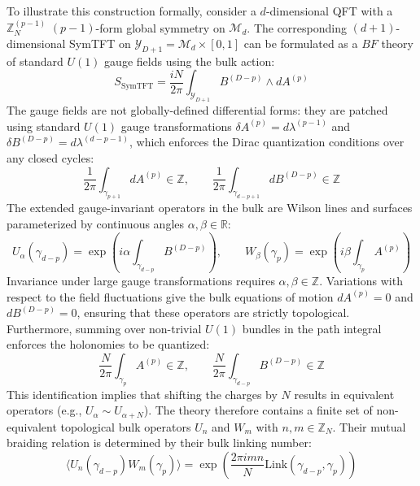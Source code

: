 \documentclass[aps,preprint,nofootinbib,preprintnumbers,eqsecnum,superscriptaddress]{revtex4}
\numberwithin{equation}{section}
\begin{document}
To illustrate this construction formally, consider a $d$-dimensional QFT with a $\mathbb{Z}_N^{(p-1)}$ $(p-1)$-form global symmetry on $\mathcal{M}_d$. The corresponding $(d+1)$-dimensional SymTFT on $\mathcal{Y}_{D+1} = \mathcal{M}_d \times [0,1]$ can be formulated as a $BF$ theory of standard $U(1)$ gauge fields using the bulk action:
\begin{equation}\label{eq:zn_symtft_action}
    S_{\text{SymTFT}} = \frac{iN}{2\pi} \int_{\mathcal{Y}_{D+1}} B^{(D-p)} \wedge dA^{(p)}
\end{equation}
The gauge fields are not globally-defined differential forms: they are patched using standard $U(1)$ gauge transformations $\delta A^{(p)} = d\lambda^{(p-1)}$ and $\delta B^{(D-p)} = d\lambda^{(d-p-1)}$, which enforces the Dirac quantization conditions over any closed cycles:
\begin{equation}
    \frac{1}{2\pi} \int_{\gamma_{p+1}} dA^{(p)} \in \mathbb{Z} , \qquad \frac{1}{2\pi} \int_{\gamma_{d-p+1}} dB^{(D-p)} \in \mathbb{Z}
\end{equation}
The extended gauge-invariant operators in the bulk are Wilson lines and surfaces parameterized by continuous angles $\alpha, \beta \in \mathbb{R}$:
\begin{equation}
    U_\alpha(\gamma_{d-p}) = \exp\left(i\alpha \int_{\gamma_{d-p}} B^{(D-p)}\right), \qquad W_\beta(\gamma_p) = \exp\left(i\beta \int_{\gamma_p} A^{(p)}\right)
\end{equation}
Invariance under large gauge transformations requires $\alpha, \beta \in \mathbb{Z}$. Variations with respect to the field fluctuations give the bulk equations of motion $dA^{(p)} = 0$ and $dB^{(D-p)} = 0$, ensuring that these operators are strictly topological. Furthermore, summing over non-trivial $U(1)$ bundles in the path integral enforces the holonomies to be quantized:
\begin{equation}
    \frac{N}{2\pi}\int_{\gamma_p} A^{(p)} \in \mathbb{Z}, \qquad \frac{N}{2\pi}\int_{\gamma_{d-p}} B^{(D-p)} \in \mathbb{Z}
\end{equation}
This identification implies that shifting the charges by $N$ results in equivalent operators (e.g., $U_{\alpha} \sim U_{\alpha+N}$). The theory therefore contains a finite set of non-equivalent topological bulk operators $U_n$ and $W_m$ with $n,m \in \mathbb{Z}_N$. Their mutual braiding relation is determined by their bulk linking number:
\begin{equation}
    \langle U_n(\gamma_{d-p}) W_m(\gamma_p) \rangle = \exp\left(\frac{2\pi i mn}{N} \text{Link}(\gamma_{d-p}, \gamma_p)\right)
\end{equation}
\end{document}
